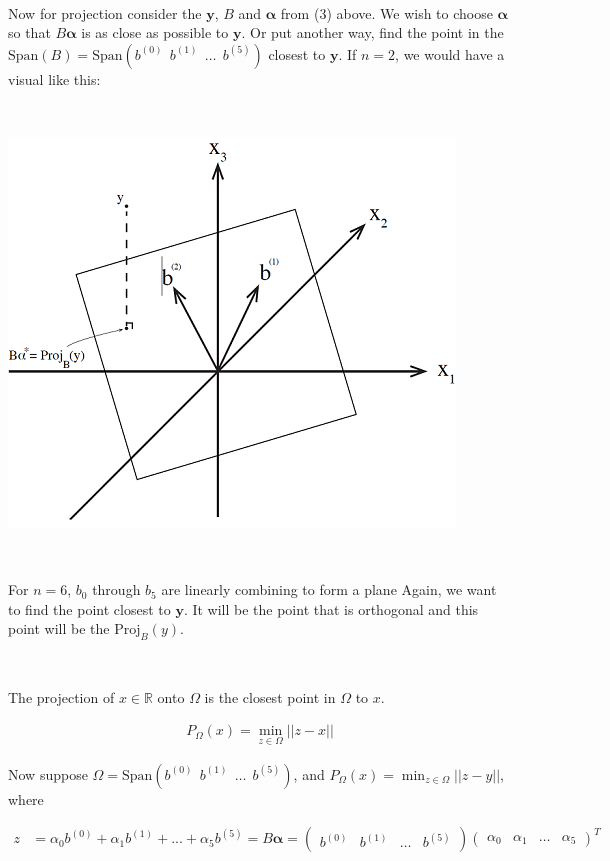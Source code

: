 \documentclass[]{article}
\begin{document}
~

Now for projection consider the \({\bm y}\), \(B\) and \({\bm \alpha}\)
from (3) above. We wish to choose \({\bm \alpha}\) so that
\(B{\bm \alpha}\) is as close as possible to \({\bm y}\). Or put another
way, find the point in the
\(\text{Span}(B) = \text{Span}\left(b^{(0)} \ \ b^{(1)} \ \ \dots \ \ b^{(5)}\right)\)
closest to \({\bm y}\). If \(n=2\), we would have a visual like this:

~

\hfil \includegraphics{proj2.png}

~

For \(n=6\), \(b_{0}\) through \(b_{5}\) are linearly combining to form
a plane Again, we want to find the point closest to \({\bm y}\). It will
be the point that is orthogonal and this point will be the
\(\text{Proj}_B(y)\).

~

The projection of \(x \in \mathbb{R}\) onto \(\Omega\) is the closest
point in \(\Omega\) to \(x\).

\begin{align*}
    P_\Omega(x) = \min_{z \in \Omega} ||z-x||
\end{align*}

Now suppose
\(\Omega = \text{Span}\left(b^{(0)} \ \ b^{(1)} \ \ \dots \ \ b^{(5)}\right)\),
and \(\displaystyle P_\Omega(x) = \min_{z \in \Omega} ||z-y|| \), where

\begin{align*}
     z &= \alpha_0 b^{(0)} + \alpha_1 b^{(1)} + ... + \alpha_5 b^{(5)} = B{\bm \alpha} = 
        \begin{pmatrix}
         b^{(0)} &  b^{(1)}& \dots & b^{(5)}
        \end{pmatrix}
        \begin{pmatrix}
        \alpha_0 & \alpha_1 & \dots & \alpha_5
        \end{pmatrix}^T
\end{align*}
\end{document}
